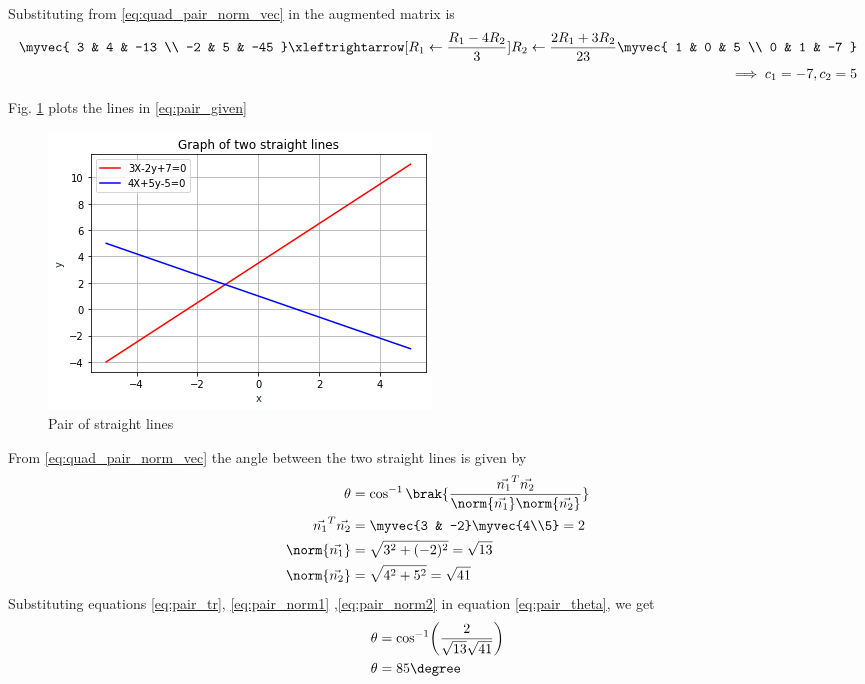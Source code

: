 \begin{enumerate}[label=\thesection.\arabic*.,ref=\thesection.\theenumi]
 Substituting from \eqref{eq:quad_pair_norm_vec}
in 
the augmented matrix is
\begin{align}
\myvec{
3 & 4 & -13
\\
-2 & 5 & -45
}
\xleftrightarrow[R_1 \leftarrow \frac{R_1 - 4R_2}{3}]{R_2 \leftarrow \frac{2R_1 + 3R_2}{23}}
\myvec{
1 & 0 & 5
\\
0 & 1 & -7
}
\\
\implies c_1 = -7, c_2 = 5
\end{align}

Fig.     \ref{fig:pair} plots the lines in \eqref{eq:pair_given}
%
\begin{figure}[h]
    \centering
    \includegraphics[width=\columnwidth]{./figs/pair/pair_ang.png}
    \caption{Pair of straight lines}
    \label{fig:pair}
\end{figure}

 From \eqref{eq:quad_pair_norm_vec}
the angle between the two straight lines is given by 
\begin{align}
    \theta&=\cos^{-1}\brak{\frac{\vec{n_1}^T\vec{n_2}}{\norm{\vec{n_1}}\norm{\vec{n_2}}}}
\label{eq:pair_theta}
\\
    \vec{n_1}^T\vec{n_2}&=\myvec{3 & -2}\myvec{4\\5}=2\label{eq:pair_tr}\\
    \norm{\vec{n_1}}&=\sqrt{3^2+(-2)^2}=\sqrt{13}\label{eq:pair_norm1}\\
    \norm{\vec{n_2}}&=\sqrt{4^2+5^2}=\sqrt{41}\label{eq:pair_norm2}
\end{align}
Substituting equations \eqref{eq:pair_tr}, \eqref{eq:pair_norm1} ,\eqref{eq:pair_norm2} in equation \eqref{eq:pair_theta}, we get 
\begin{align}
        \theta&=\cos^{-1}\biggl(\frac{2}{\sqrt{13}\sqrt{41}}\biggr)\\
        \theta&=85\degree
\end{align}


\end{enumerate}

